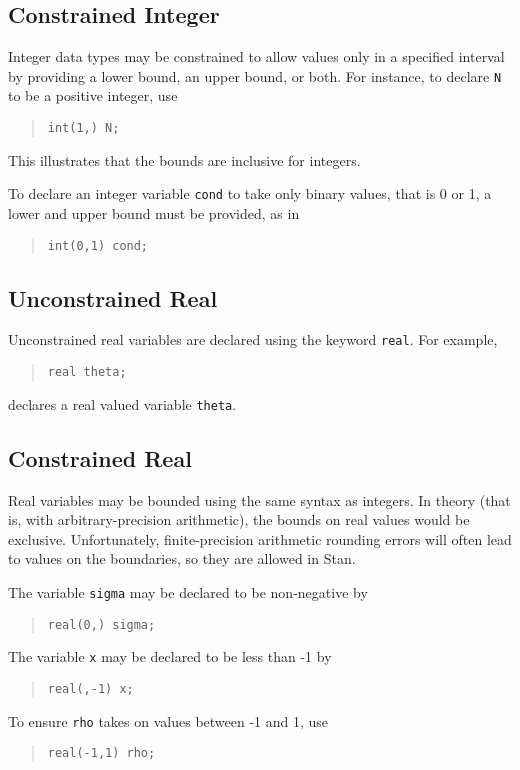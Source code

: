 \documentclass[10pt]{report}
\newcommand{\Stan}{Stan\xspace}
\newcommand{\code}[1]{{\tt #1}}
\begin{document}
\subsection{Constrained Integer}

Integer data types may be constrained to allow values only in a
specified interval by providing a lower bound, an upper bound, or
both.  For instance, to declare \code{N} to be a positive integer, use
%
\begin{quote}
\begin{Verbatim}
int(1,) N;
\end{Verbatim}
\end{quote}
%
This illustrates that the bounds are inclusive for integers.

To declare an integer variable \code{cond} to take only binary values,
that is 0 or 1, a lower and upper bound must be provided, as in
%
\begin{quote}
\begin{Verbatim} 
int(0,1) cond;
\end{Verbatim}
\end{quote}


\subsection{Unconstrained Real}

Unconstrained real variables are declared using the keyword
\code{real}.  For example,
%
\begin{quote}
\begin{Verbatim}
real theta;
\end{Verbatim}
\end{quote}
%
declares a real valued variable \code{theta}.

\subsection{Constrained Real}

Real variables may be bounded using the same syntax as integers.  In
theory (that is, with arbitrary-precision arithmetic), the bounds on
real values would be exclusive.  Unfortunately, finite-precision
arithmetic rounding errors will often lead to values on the
boundaries, so they are allowed in \Stan.
 
The variable \code{sigma} may be declared to be non-negative by
%
\begin{quote}
\begin{Verbatim}
real(0,) sigma;
\end{Verbatim}
\end{quote}
%
The variable \code{x} may be declared to be less than -1 by
%
\begin{quote}
\begin{Verbatim} 
real(,-1) x;
\end{Verbatim}
\end{quote}
% 
To ensure \code{rho} takes on values between -1 and 1, use
%
\begin{quote}
\begin{Verbatim}
real(-1,1) rho;
\end{Verbatim}
\end{quote}
%
\end{document}
